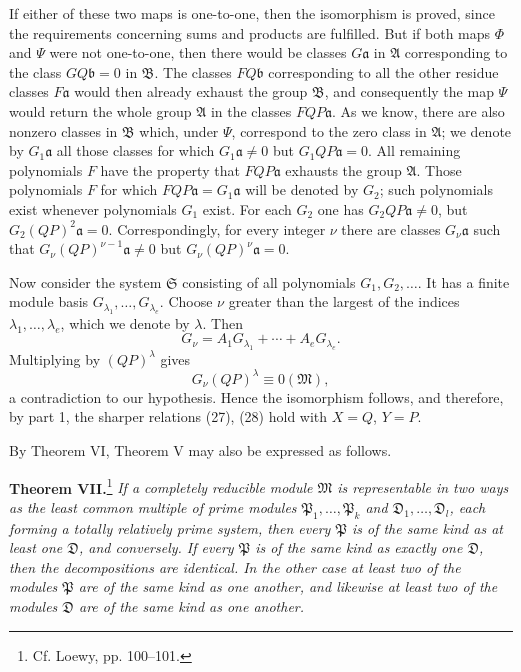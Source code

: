 \documentclass[11pt]{article}
\newcommand{\mM}{\mathfrak{M}}
\newcommand{\mA}{\mathfrak{A}}
\newcommand{\mB}{\mathfrak{B}}
\newcommand{\ma}{\mathfrak{a}}
\newcommand{\mb}{\mathfrak{b}}
\newcommand{\mP}{\mathfrak{P}}
\newcommand{\mS}{\mathfrak{S}}
\newcommand{\mD}{\mathfrak{D}}
\begin{document}
If either of these two maps is one-to-one, then the isomorphism is proved, since the requirements concerning sums and products are fulfilled. But if both maps $\Phi$ and $\Psi$ were not one-to-one, then there would be classes $G\ma$ in $\mA$ corresponding to the class $GQ\mb=0$ in $\mB$. The classes $FQ\mb$ corresponding to all the other residue classes $F\ma$ would then already exhaust the group $\mB$, and consequently the map $\Psi$ would return the whole group $\mA$ in the classes $FQP\ma$. As we know, there are also nonzero classes in $\mB$ which, under $\Psi$, correspond to the zero class in $\mA$; we denote by $G_1\ma$ all those classes for which $G_1\ma\ne0$ but $G_1QP\ma=0$. All remaining polynomials $F$ have the property that $FQP\ma$ exhausts the group $\mA$. Those polynomials $F$ for which $FQP\ma=G_1\ma$ will be denoted by $G_2$; such polynomials exist whenever polynomials $G_1$ exist. For each $G_2$ one has $G_2QP\ma\ne0$, but $G_2(QP)^2\ma=0$. Correspondingly, for every integer $\nu$ there are classes $G_\nu\ma$ such that $G_\nu(QP)^{\nu-1}\ma\ne0$ but $G_\nu(QP)^\nu\ma=0$.

Now consider the system $\mS$ consisting of all polynomials $G_1,G_2,
\ldots$. It has a finite module basis $G_{\lambda_1},\ldots,G_{\lambda_e}$. Choose $\nu$ greater than the largest of the indices $\lambda_1,
\ldots,\lambda_e$, which we denote by $\lambda$. Then
\[
 G_\nu=A_1G_{\lambda_1}+\cdots+A_eG_{\lambda_e}.
\]
Multiplying by $(QP)^\lambda$ gives
\[
 G_\nu(QP)^\lambda\equiv0(\mM),
\]
a contradiction to our hypothesis. Hence the isomorphism follows, and therefore, by part 1, the sharper relations (27), (28) hold with $X=Q$, $Y=P$.

By Theorem VI, Theorem V may also be expressed as follows.

\textbf{Theorem VII.}\footnote{Cf. Loewy, pp. 100--101.} \emph{If a completely reducible module $\mM$ is representable in two ways as the least common multiple of prime modules $\mP_1,
\ldots,\mP_k$ and $\mD_1,
\ldots,\mD_l$, each forming a totally relatively prime system, then every $\mP$ is of the same kind as at least one $\mD$, and conversely. If every $\mP$ is of the same kind as exactly one $\mD$, then the decompositions are identical. In the other case at least two of the modules $\mP$ are of the same kind as one another, and likewise at least two of the modules $\mD$ are of the same kind as one another.}
\end{document}
